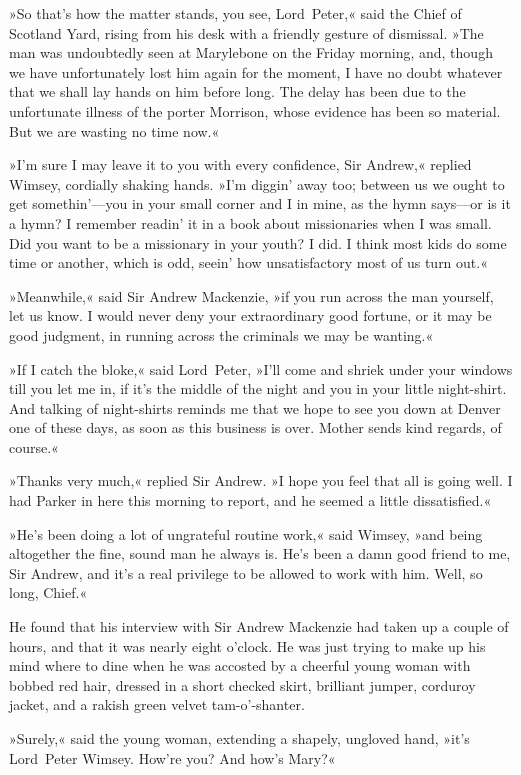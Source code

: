 »So that's how the matter stands, you see, Lord~Peter,« said the Chief of Scotland Yard, rising from his desk with a friendly gesture of dismissal. »The man was undoubtedly seen at Marylebone on the Friday morning, and, though we have unfortunately lost him again for the moment, I have no doubt whatever that we shall lay hands on him before long. The delay has been due to the unfortunate illness of the porter Morrison, whose evidence has been so material. But we are wasting no time now.«

»I'm sure I may leave it to you with every confidence, Sir Andrew,« replied Wimsey, cordially shaking hands. »I'm diggin' away too; between us we ought to get somethin'—you in your small corner and I in mine, as the hymn says—or is it a hymn? I remember readin' it in a book about missionaries when I was small. Did you want to be a missionary in your youth? I did. I think most kids do some time or another, which is odd, seein' how unsatisfactory most of us turn out.«

»Meanwhile,« said Sir Andrew Mackenzie, »if you run across the man yourself, let us know. I would never deny your extraordinary good fortune, or it may be good judgment, in running across the criminals we may be wanting.«

»If I catch the bloke,« said Lord~Peter, »I'll come and shriek under your windows till you let me in, if it's the middle of the night and you in your little night-shirt. And talking of night-shirts reminds me that we hope to see you down at Denver one of these days, as soon as this business is over. Mother sends kind regards, of course.«

»Thanks very much,« replied Sir Andrew. »I hope you feel that all is going well. I had Parker in here this morning to report, and he seemed a little dissatisfied.«

»He's been doing a lot of ungrateful routine work,« said Wimsey, »and being altogether the fine, sound man he always is. He's been a damn good friend to me, Sir Andrew, and it's a real privilege to be allowed to work with him. Well, so long, Chief.«

He found that his interview with Sir Andrew Mackenzie had taken up a couple of hours, and that it was nearly eight o'clock. He was just trying to make up his mind where to dine when he was accosted by a cheerful young woman with bobbed red hair, dressed in a short checked skirt, brilliant jumper, corduroy jacket, and a rakish green velvet tam-o'-shanter.

»Surely,« said the young woman, extending a shapely, ungloved hand, »it's Lord~Peter Wimsey. How're you? And how's Mary?«

